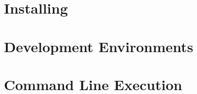 
    \section{Installing \LaTeXe}
    \label{Installing}


    \section{Development Environments}
    \label{Development Environments}


    \section{Command Line Execution}
    \label{Command Line}

